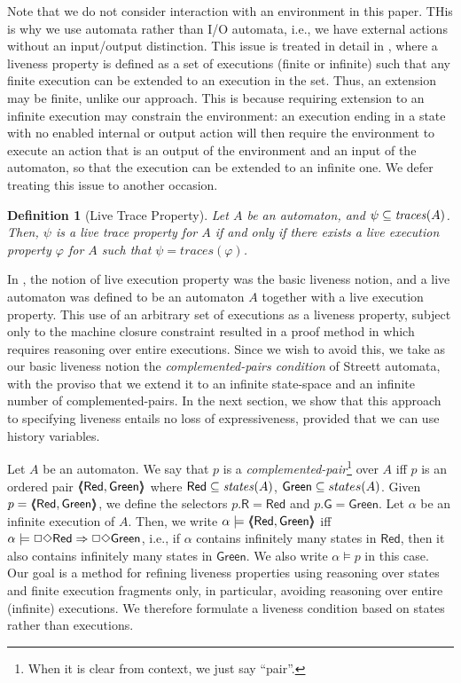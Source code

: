 \documentclass[11pt]{article}
\newcommand{\bd}{\begin{definition}}
\newcommand{\ed}{\end{definition}}
\newcommand{\intrdef}{\emph}	\newcommand{\intr}{\emph}
\newcommand{\sat}{\models}
\newcommand{\GREEN}{\mathsf{Green}}
\newcommand{\RED}{\mathsf{Red}}
\newcommand{\G}{\mathsf{G}}
\newcommand{\R}{\mathsf{R}}
\newcommand{\pair}[2]{\lpb #1, #2 \rpb}
\newcommand{\lpb}{\langle \hspace{-0.34em} \langle \hspace{-0.34em} \langle}
\newcommand{\rpb}{\rangle \hspace{-0.34em} \rangle \hspace{-0.34em} \rangle}
\newcommand{\al}{\alpha}
\newcommand{\states}{\mathit{states}}
\newcommand{\traces}{\mathit{traces}}
\newcommand{\iof}{\Box \Diamond}
\newtheorem{definition}{Definition}
\begin{document}
Note that we do not consider interaction with an environment in this
paper. THis is why we use automata rather than I/O automata, i.e., we
have external actions without an input/output distinction.
This issue is treated in detail in \cite{GSSL98}, where a
liveness property is defined as a set of executions (finite or
infinite) such that 
any finite execution can be extended to an execution in the set.
Thus, an extension may be finite, unlike our approach. This is because
requiring extension to an infinite execution may constrain the
environment: an execution ending in a state with no enabled internal
or output action will then require the environment to execute an
action that is an output of the environment and an input of the
automaton, so that the execution can be extended to an infinite one. 
We defer treating this issue to another occasion.


\bd[Live Trace Property]
\label{def:live-trace-property}
Let $A$ be an automaton, and $\psi \sub \traces(A)$. Then,
$\psi$ is a \emph{live trace property} for $A$ if and only if
there exists a live execution property $\varphi$ for $A$ such that 
$\psi = \traces(\varphi)$.
\ed

In \cite{GSSL93,GSSL98}, the notion of live execution property was the
basic liveness notion, and a live automaton was defined to be an
automaton $A$ together with a live execution property.
This use of an arbitrary set of executions as a liveness property,
subject only to the machine closure constraint resulted in a proof
method in \cite{GSSL93} which requires reasoning over entire
executions. Since we wish to avoid this, we take as our basic liveness
notion the \intr{complemented-pairs condition} of Streett automata,
with the proviso that we extend it to an infinite state-space and an
infinite number of complemented-pairs.
In the next section, we show that this approach to specifying liveness
entails no loss of expressiveness, provided that we can use history
variables.



Let $A$ be an automaton. We say that $p$ is a
\intrdef{complemented-pair}\footnote{When it is clear from context, we just
say ``pair''.} over $A$ iff $p$ is an ordered pair
$\pair{\RED}{\GREEN}$ where $\RED \sub \states(A)$, $\GREEN \sub states(A)$.
Given $p = \pair{\RED}{\GREEN}$, we define the selectors $p.\R = \RED$ and $p.\G =
\GREEN$. 
Let $\al$ be an infinite execution of $A$. Then, we write
$\al \sat \pair{\RED}{\GREEN}$ iff $\al \sat \iof \RED \imp \iof \GREEN$,
i.e., if $\al$ contains infinitely many states
in $\RED$, then it also contains infinitely many states in
$\GREEN$.
We also write 
$\al \sat p$ in this case. Our goal is a method for refining liveness properties using reasoning
over states and finite execution fragments only, in particular,
avoiding reasoning over entire (infinite) executions. We therefore formulate a
liveness condition based on states rather than executions.
\end{document}
